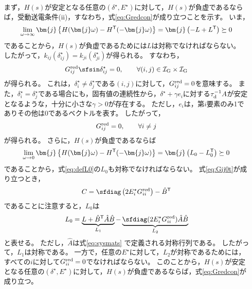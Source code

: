 \documentclass[tombow,dvipdfmx]{corona-a5-1.1}
\begin{document}
\begin{証明}
まず，$H(s)$が安定となる任意の$(\delta^{\star},E^{\star})$に対して，$H(s)$が負虚であるならば，受動送電条件(ii)，すなわち，式\ref{eq:Gredcon}が成り立つことを示す。
いま，
\[
\lim_{\omega \rightarrow \infty} \bm{j}
\left\{
H(\bm{j}\omega)-H^{\sf T}(-\bm{j}\omega)
\right\}
=\bm{j}
\left(
-L+L^{\sf T}
\right) \succeq 0
\]
であることから，$H(s)$が負虚であるためには$L$は対称でなければならない。
したがって，$k_{ij}(\delta_{ij}^{\star}) = k_{ji}(\delta_{ji}^{\star})$が得られる。
すなわち，
\[
G^{\rm red}_{ij} \sfsin \delta_{ij}^{\star} = 0 ,\qquad
\forall (i, j) \in \mathcal{I}_{\rm G} \times \mathcal{I}_{\rm G}
\]
が得られる。
これは，$\delta_{i}^{\star}\neq \delta_{j}^{\star}$である$(i,j)$に対して，$G^{\rm red}_{ij}=0$を意味する。
また，$\delta_{i}^{\star}= \delta_{j}^{\star}$である場合にも，固有値の連続性から，$\delta^{\star}+\gamma e_i$に対する$\tau_{\rm d}^{-1}A$が安定となるような，十分に小さな$\gamma>0$が存在する。
ただし，$e_i$は，第$i$要素のみ1でありその他は0であるベクトルを表す。
したがって，
\begin{align}\label{eq:Gij0t}
G^{\rm red}_{ij}=0, \qquad
\forall i\neq j
\end{align}
が得られる。
さらに，$H(s)$が負虚であるならば
\[
\lim_{\omega \rightarrow 0} \bm{j}
\left\{
H(\bm{j}\omega)-H^{\sf T}(-\bm{j}\omega)
\right\}
=\bm{j}
\left(
L_0-L_0^{\sf T}
\right) \succeq 0
\]
であることから，式\ref{eq:defL0}の$L_0$も対称でなければならない。
式\ref{eq:Gij0t}が成り立つとき，
\[
C = \sfdiag \left(
2E_i^{\star} G^{\rm red}_{ii}
\right)  - \hat{B}^{\sf T}
\]
であることに注意すると，$L_0$は
\[
L_0 = \underbrace{ L + \hat{B}^{\sf T} \hat{A} \hat{B} }_{L_1}
-
\underbrace{ \sfdiag (
2 E_i^{\star} G^{\rm red}_{ii}
) \hat{A} \hat{B}
}_{L_2}
\]
と表せる。
ただし，$\hat{A}$は式\ref{eq:sysmats}
で定義される対称行列である。
したがって，$L_1$は対称である。
一方で，任意の$E^{\star}$に対して，$L_2$が対称であるためには，すべての$i$に対して$G^{\rm red}_{ii}=0$でなければならない。
このことから，$H(s)$が安定となる任意の$(\delta^{\star},E^{\star})$に対して，$H(s)$が負虚であるならば，式\ref{eq:Gredcon}が成り立つ。



\end{証明}
\end{document}
